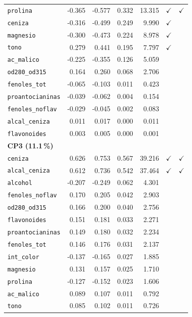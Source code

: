 \documentclass[11pt,a4paper]{article}
\begin{document}
\begin{table}[H]
\begin{tabular}{lrrrrcc}
\texttt{prolina} & -0.365 & -0.577 & 0.332 & 13.315 & $\checkmark$ & $\checkmark$ \\
\texttt{ceniza} & -0.316 & -0.499 & 0.249 & 9.990 & $\checkmark$ &  \\
\texttt{magnesio} & -0.300 & -0.473 & 0.224 & 8.978 & $\checkmark$ &  \\
\texttt{tono} & 0.279 & 0.441 & 0.195 & 7.797 & $\checkmark$ &  \\
\texttt{ac\_malico} & -0.225 & -0.355 & 0.126 & 5.059 &  &  \\
\texttt{od280\_od315} & 0.164 & 0.260 & 0.068 & 2.706 &  &  \\
\texttt{fenoles\_tot} & -0.065 & -0.103 & 0.011 & 0.423 &  &  \\
\texttt{proantocianinas} & -0.039 & -0.062 & 0.004 & 0.154 &  &  \\
\texttt{fenoles\_noflav} & -0.029 & -0.045 & 0.002 & 0.083 &  &  \\
\texttt{alcal\_ceniza} & 0.011 & 0.017 & 0.000 & 0.011 &  &  \\
\texttt{flavonoides} & 0.003 & 0.005 & 0.000 & 0.001 &  &  \\
\midrule
\multicolumn{7}{l}{\textbf{CP3 (11.1\,\%)}} \\
\texttt{ceniza} & 0.626 & 0.753 & 0.567 & 39.216 & $\checkmark$ & $\checkmark$ \\
\texttt{alcal\_ceniza} & 0.612 & 0.736 & 0.542 & 37.464 & $\checkmark$ & $\checkmark$ \\
\texttt{alcohol} & -0.207 & -0.249 & 0.062 & 4.301 &  &  \\
\texttt{fenoles\_noflav} & 0.170 & 0.205 & 0.042 & 2.903 &  &  \\
\texttt{od280\_od315} & 0.166 & 0.200 & 0.040 & 2.756 &  &  \\
\texttt{flavonoides} & 0.151 & 0.181 & 0.033 & 2.271 &  &  \\
\texttt{proantocianinas} & 0.149 & 0.180 & 0.032 & 2.234 &  &  \\
\texttt{fenoles\_tot} & 0.146 & 0.176 & 0.031 & 2.137 &  &  \\
\texttt{int\_color} & -0.137 & -0.165 & 0.027 & 1.885 &  &  \\
\texttt{magnesio} & 0.131 & 0.157 & 0.025 & 1.710 &  &  \\
\texttt{prolina} & -0.127 & -0.152 & 0.023 & 1.606 &  &  \\
\texttt{ac\_malico} & 0.089 & 0.107 & 0.011 & 0.792 &  &  \\
\texttt{tono} & 0.085 & 0.102 & 0.011 & 0.726 &  &  \\
\bottomrule
\end{tabular}
\end{table}
\end{document}
